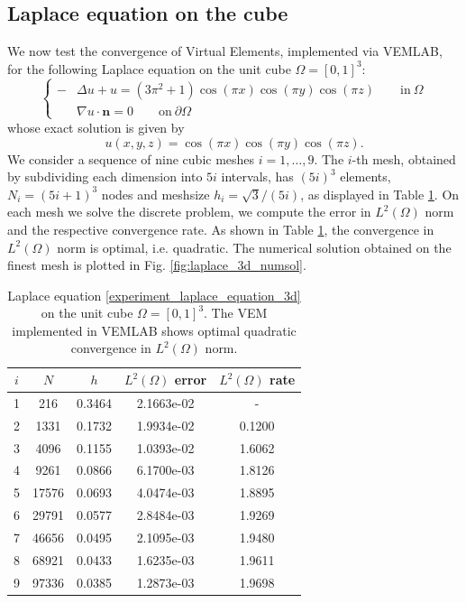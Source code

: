 \documentclass[a4paper]{article}
\begin{document}
\subsection{Laplace equation on the cube}
We now test the convergence of Virtual Elements, implemented via VEMLAB,  for the following  Laplace equation on the unit cube $\Omega = [0,1]^3$:
\begin{equation}
\label{experiment_laplace_equation_3d}
\begin{cases}
-&\Delta u + u = (3\pi^2+1)\cos(\pi x)\cos(\pi y)\cos(\pi z) \qquad \text{in}\ \Omega\\
&\nabla u \cdot \boldsymbol{n} = 0 \qquad \text{on}\ \partial \Omega
\end{cases}
\end{equation}
whose exact solution  is given by
\begin{equation}
u(x,y,z) = \cos(\pi x)\cos(\pi y)\cos(\pi z).
\end{equation}
We consider a sequence of nine cubic meshes $i=1,\dots,9$. The $i$-th mesh, obtained by subdividing each dimension into $5i$ intervals,  has $(5i)^3$ elements, $N_i = (5i+1)^3$ nodes and meshsize $h_i = \sqrt{3}/(5i)$, as displayed in Table \ref{tab:laplace_3d_convergence}. On each mesh we solve the discrete problem,  we compute the error in $L^2(\Omega)$ norm and the respective convergence rate. As shown in Table \ref{tab:laplace_3d_convergence}, the convergence in $L^2(\Omega)$ norm is optimal, i.e. quadratic. The numerical solution obtained on the finest mesh is plotted in Fig.  \ref{fig:laplace_3d_numsol}.

\begin{table}[H]
\caption{Laplace equation \eqref{experiment_laplace_equation_3d} on the unit cube $\Omega = [0,1]^3$. The VEM implemented in VEMLAB shows optimal quadratic convergence in $L^2(\Omega)$ norm.}
\begin{center}
\begin{tabular}{c | c | c | c | c}
$i$ & $N$ & $h$ & $L^2(\Omega)$ error & $L^2(\Omega)$ rate\\
\hline
1 & 216 & 0.3464 &   2.1663e-02 &     -\\
2 & 1331 & 0.1732 & 1.9934e-02 & 0.1200    \\
3 & 4096 & 0.1155 & 1.0393e-02 & 1.6062    \\
4 & 9261 & 0.0866 &  6.1700e-03 & 1.8126    \\
5 &  17576 &  0.0693 & 4.0474e-03 & 1.8895    \\
6 & 29791  & 0.0577 & 2.8484e-03 & 1.9269    \\
7 &  46656 & 0.0495 & 2.1095e-03 & 1.9480    \\
8 & 68921 & 0.0433 & 1.6235e-03  & 1.9611   \\
9 & 97336 & 0.0385 &  1.2873e-03 &  1.9698
\end{tabular}
\end{center}
\label{tab:laplace_3d_convergence}
\end{table}
\end{document}
